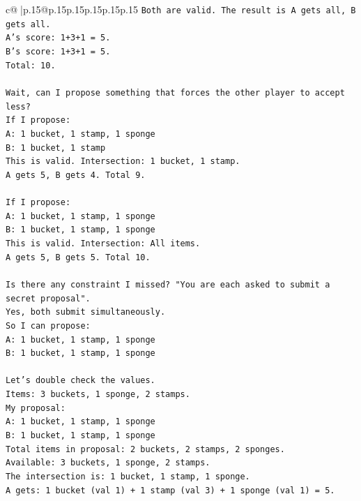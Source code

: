 \documentclass{article}
\begin{document}
{\begin{supertabular}{c@{$\;$}|p{.15\linewidth}@{}p{.15\linewidth}p{.15\linewidth}p{.15\linewidth}p{.15\linewidth}p{.15\linewidth}}
{{{\texttt{Both are valid. The result is A gets all, B gets all.} \\
\texttt{A's score: 1+3+1 = 5.} \\
\texttt{B's score: 1+3+1 = 5.} \\
\texttt{Total: 10.} \\
\\ 
\texttt{Wait, can I propose something that forces the other player to accept less?} \\
\texttt{If I propose:} \\
\texttt{A: 1 bucket, 1 stamp, 1 sponge} \\
\texttt{B: 1 bucket, 1 stamp} \\
\texttt{This is valid. Intersection: 1 bucket, 1 stamp.} \\
\texttt{A gets 5, B gets 4. Total 9.} \\
\\ 
\texttt{If I propose:} \\
\texttt{A: 1 bucket, 1 stamp, 1 sponge} \\
\texttt{B: 1 bucket, 1 stamp, 1 sponge} \\
\texttt{This is valid. Intersection: All items.} \\
\texttt{A gets 5, B gets 5. Total 10.} \\
\\ 
\texttt{Is there any constraint I missed? "You are each asked to submit a secret proposal".} \\
\texttt{Yes, both submit simultaneously.} \\
\texttt{So I can propose:} \\
\texttt{A: 1 bucket, 1 stamp, 1 sponge} \\
\texttt{B: 1 bucket, 1 stamp, 1 sponge} \\
\\ 
\texttt{Let's double check the values.} \\
\texttt{Items: 3 buckets, 1 sponge, 2 stamps.} \\
\texttt{My proposal:} \\
\texttt{A: 1 bucket, 1 stamp, 1 sponge} \\
\texttt{B: 1 bucket, 1 stamp, 1 sponge} \\
\texttt{Total items in proposal: 2 buckets, 2 stamps, 2 sponges.} \\
\texttt{Available: 3 buckets, 1 sponge, 2 stamps.} \\
\texttt{The intersection is: 1 bucket, 1 stamp, 1 sponge.} \\
\texttt{A gets: 1 bucket (val 1) + 1 stamp (val 3) + 1 sponge (val 1) = 5.} \\
}}}
\end{supertabular}}
\end{document}
